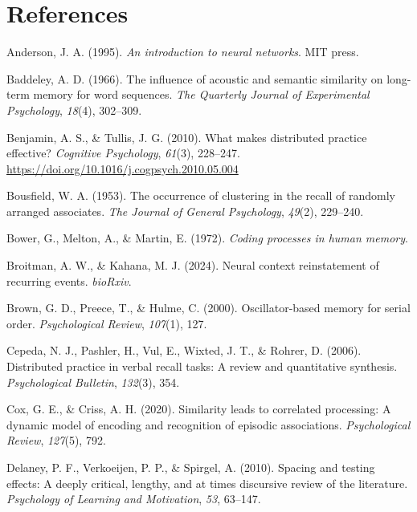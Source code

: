\documentclass[
  man,
  floatsintext,
  longtable,
  nolmodern,
  notxfonts,
  notimes,
  draftfirst,
  colorlinks=true,linkcolor=blue,citecolor=blue,urlcolor=blue]{apa7}
\newlength{\cslhangindent}
\newenvironment{CSLReferences}[2] %
 {\begin{list}{}{%
  \setlength{\itemindent}{0pt}
  \setlength{\leftmargin}{0pt}
  \setlength{\parsep}{0pt}
  \ifodd #1
   \setlength{\leftmargin}{\cslhangindent}
   \setlength{\itemindent}{-1\cslhangindent}
  \fi
  \setlength{\itemsep}{#2\baselineskip}}}
 {\end{list}}
\begin{document}
\section{References}\label{references}

\label{refs}
\begin{CSLReferences}{1}{0}
Anderson, J. A. (1995). \emph{An introduction to neural networks}. MIT
press.

Baddeley, A. D. (1966). The influence of acoustic and semantic
similarity on long-term memory for word sequences. \emph{The Quarterly
Journal of Experimental Psychology}, \emph{18}(4), 302--309.

Benjamin, A. S., \& Tullis, J. G. (2010). What makes distributed
practice effective? \emph{Cognitive Psychology}, \emph{61}(3), 228--247.
\url{https://doi.org/10.1016/j.cogpsych.2010.05.004}

Bousfield, W. A. (1953). The occurrence of clustering in the recall of
randomly arranged associates. \emph{The Journal of General Psychology},
\emph{49}(2), 229--240.

Bower, G., Melton, A., \& Martin, E. (1972). \emph{Coding processes in
human memory}.

Broitman, A. W., \& Kahana, M. J. (2024). Neural context reinstatement
of recurring events. \emph{bioRxiv}.

Brown, G. D., Preece, T., \& Hulme, C. (2000). Oscillator-based memory
for serial order. \emph{Psychological Review}, \emph{107}(1), 127.

Cepeda, N. J., Pashler, H., Vul, E., Wixted, J. T., \& Rohrer, D.
(2006). Distributed practice in verbal recall tasks: A review and
quantitative synthesis. \emph{Psychological Bulletin}, \emph{132}(3),
354.

Cox, G. E., \& Criss, A. H. (2020). Similarity leads to correlated
processing: A dynamic model of encoding and recognition of episodic
associations. \emph{Psychological Review}, \emph{127}(5), 792.

Delaney, P. F., Verkoeijen, P. P., \& Spirgel, A. (2010). Spacing and
testing effects: A deeply critical, lengthy, and at times discursive
review of the literature. \emph{Psychology of Learning and Motivation},
\emph{53}, 63--147.


\end{CSLReferences}
\end{document}
